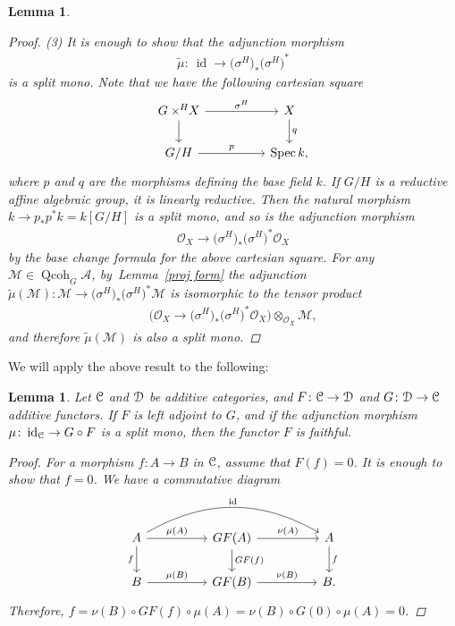 \documentclass[pdftex]{sigma}%
\newtheorem{lem}[dfn]{Lemma}
\numberwithin{equation}{section}
\newcommand{\Spec}{\operatorname{Spec}}
\newcommand{\Qcoh}{\operatorname{Qcoh}}
\newcommand{\id}{\operatorname{id}}
\newcommand{\cA}{\mathcal{A}}
\newcommand{\cM}{\mathcal{M}}
\newcommand{\cO}{\mathcal{O}}
\newcommand{\scrC}{\EuScript{C}}
\newcommand{\scrD}{\EuScript{D}}
\newcommand{\timesH}{\times^{\hspace{-0.2mm}H\hspace{0.2mm}}\!\!}
\begin{document}
\begin{lem}
\begin{proof}
(3) It is enough to show that the adjunction morphism
\begin{gather*}
\widetilde{\mu}\colon\ \id \to \big(\sigma^H\big)_*\big(\sigma^H\big)^*
\end{gather*}
is a split mono.
 Note that we have the following cartesian square
\[
\begin{tikzcd}
G\timesH X\arrow[rr,"\sigma^H"]\arrow[d]&&X\arrow[d, "q"]
\\
G/H\arrow[rr, "p"]&&\Spec k,
\end{tikzcd}
\]
where $p$ and $q$ are the morphisms defining the base field $k$.
If $G/H$ is a reductive affine algebraic group, it is linearly reductive. Then the natural morphism
$k\to p_*p^*k=k[G/H]$
is a split mono, and so is the adjunction morphism
\begin{gather*}
\cO_X\to\big(\sigma^H\big)_*\big(\sigma^H\big)^*\cO_{X}
\end{gather*}
by the base change formula for the above cartesian square. For any $\cM\in \Qcoh_G\cA$, by~Lem\-ma~\ref{proj form} the adjunction $\widetilde{\mu}(\cM)\colon \cM\to \big(\sigma^H\big)_*\big(\sigma^H\big)^*\cM$ is isomorphic to the tensor product \begin{gather*}\Bigr(\cO_X\to\big(\sigma^H\big)_*\big(\sigma^H\big)^*\cO_{X}\Bigr)\otimes_{\cO_X}\cM,\end{gather*} and therefore $\widetilde{\mu}(\cM)$ is also a split mono.
\end{proof}
\end{lem}


We will apply the above result to the following:

\begin{lem}\label{faithful general}
Let $\scrC$ and $\scrD$ be additive categories, and
$F\colon \scrC\to \scrD$ and $G\colon \scrD\to \scrC$ additive functors. If $F$ is left adjoint to $G$, and if the adjunction morphism $\mu\colon \id_{\scrC}\to G\circ F$ is a split mono, then the functor $F$ is faithful.
\begin{proof}
For a morphism $f\colon A\to B$ in $\scrC$, assume that $F(f)=0$. It is enough to show that $f=0$. We have a commutative diagram
\[
\begin{tikzcd}
A\arrow[rr, "\mu(A)"]\arrow[rrrr, bend left, "\id"]\arrow[d, "f"']&&GF(A)\arrow[d, "GF(f)"]\arrow[rr, "\nu(A)"]&&A\arrow[d, "f"]\\
B\arrow[rr, "\mu(B)"]&&GF(B)\arrow[rr, "\nu(B)"]&& B.
\end{tikzcd}
\]
Therefore, $f=\nu(B)\circ GF(f)\circ \mu(A)=\nu(B)\circ G(0)\circ \mu(A)=0$.
\end{proof}
\end{lem}
\end{document}
